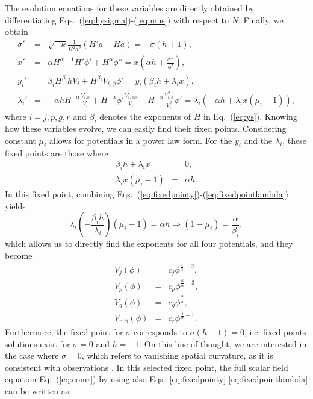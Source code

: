 \documentclass[onecolumn,superscriptaddress,secnumarabic,amssymb,amsmath,nobibnotes,aps,prd,nofootinbib,altaffilletter]{revtex4}
\begin{document}
The evolution equations for these variables are directly obtained by differentiating Eqs.~(\ref{eq:hysigma})-(\ref{eq:mus}) with respect to $N$. Finally, we obtain
\begin{eqnarray}
    \sigma' &=& \sqrt{-k}\frac{1}{H^2a^2}\left(H' a + Ha\right)=-\sigma(h+1),
    \label{eq:difsigma}\\
    x' &=& \alpha H^{\alpha-1}H'\phi' + H^\alpha \phi'' = x\left(\alpha h + \frac{\phi''}{\phi'}\right),
    \label{eq:difx}\\
    y_i' &=& \beta_i H^{\beta_i}hV_i + H^{\beta_i}V_{i,\phi}\phi' = y_i\left(\beta_i h + \lambda_i x\right),
    \label{eq:dify}\\
    \lambda_i' &=& -\alpha h H^{-\alpha}\frac{V_{i.\phi}}{V_i}+H^{-\alpha}\phi'\frac{V_{i,\phi\phi}}{V_i} - H^{-\alpha}\frac{V_{i,\phi}^2}{V_i^2}\phi'=\lambda_i\left(-\alpha h + \lambda_ix(\mu_i-1)\right),
    \label{eq:diflambda}
\end{eqnarray}
where $i=j,p,g,r$ and $\beta_i$ denotes the exponents of $H$ in Eq.~(\ref{eq:ys}). Knowing how these variables evolve, we can easily find their fixed points. Considering constant $\mu_i$ allows for potentials in a power law form. For the $y_i$ and the $\lambda_i$, these fixed points are those where
\begin{eqnarray}
    \beta_i h + \lambda_i x&=&0,
    \label{eq:fixedpointy}\\
   \lambda_i x (\mu_i -1)&=& \alpha h .
   \label{eq:fixedpointlambda}
\end{eqnarray}
In this fixed point, combining Eqs.~(\ref{eq:fixedpointy})-(\ref{eq:fixedpointlambda}) yields
\begin{equation}
    \lambda_i\left(-\frac{\beta_i h}{\lambda_i}\right)(\mu_i -1)= \alpha h \Rightarrow (1-\mu_i)=\frac{\alpha}{\beta_i},
\end{equation}
which allows us to directly find the exponents for all four potentials, and they become
\begin{eqnarray}
    V_j(\phi)&=&c_j\phi^{\frac{4}{\alpha}-2},
    \label{eq:potentialj}\\
    V_p(\phi)&=&c_p\phi^{\frac{6}{\alpha}-3},
    \label{eq:potentialp}\\
    V_g(\phi)&=&c_g\phi^{\frac{2}{\alpha}},
    \label{eq:potentialg}\\
    V_{r,\phi}(\phi)&=&c_r\phi^{\frac{4}{\alpha}-1}.
    \label{eq:potentialr}
\end{eqnarray}
Furthermore, the fixed point for $\sigma$ corresponds to $\sigma(h+1)=0$, i.e. fixed points solutions exist for $\sigma=0$ and $h=-1$. On this line of thought, we are interested in the case where $\sigma=0$, which refers to vanishing spatial curvature, as it is consistent with observations \cite{Planck_2020}. In this selected fixed point, the full scalar field equation  Eq.~(\ref{eq:eomr}) by using also Eqs.~\eqref{eq:fixedpointy}-\eqref{eq:fixedpointlambda} can be written as:
\end{document}
